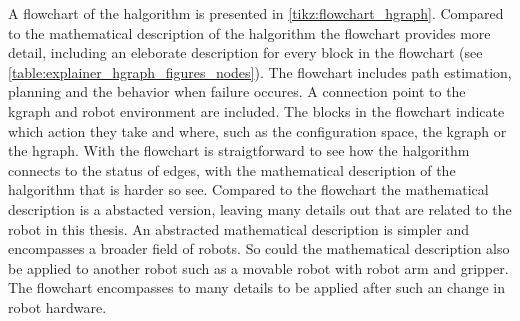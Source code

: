 A flowchart of the \ac{halgorithm} is presented in \cref{tikz:flowchart_hgraph}. Compared to the mathematical description of the \ac{halgorithm} the flowchart provides more detail, including an eleborate description for every block in the flowchart (see \cref{table:explainer_hgraph_figures_nodes}). The flowchart includes path estimation, planning and the behavior when failure occures. A connection point to the \ac{kgraph} and robot environment are included. The blocks in the flowchart indicate which action they take and where, such as the configuration space, the \ac{kgraph} or the \ac{hgraph}. With the flowchart is straigtforward to see how the \ac{halgorithm} connects to the status of edges, with the mathematical description of the \ac{halgorithm} that is harder so see. Compared to the flowchart the mathematical description is a abstacted version, leaving many details out that are related to the robot in this thesis. An abstracted mathematical description is simpler and encompasses a broader field of robots. So could the mathematical description also be applied to another robot such as a movable robot with robot arm and gripper. The flowchart encompasses to many details to be applied after such an change in robot hardware.



